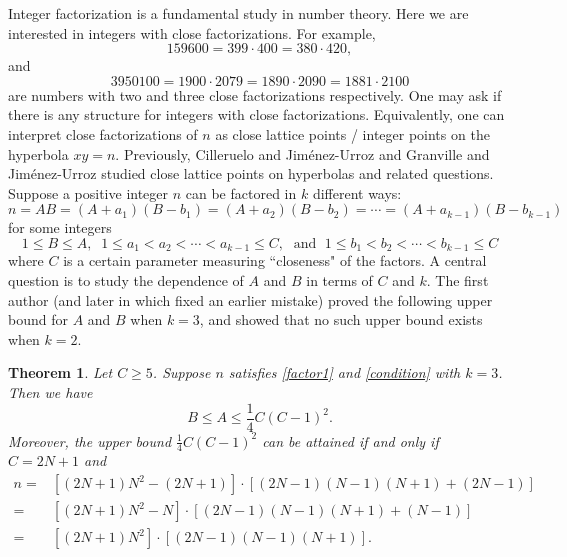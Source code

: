 \documentclass[12pt]{article}
\newtheorem{thm}{Theorem}
\begin{document}
Integer factorization is a fundamental study in number theory. Here we are interested in integers with close factorizations. For example,
\[
159600 = 399 \cdot 400 = 380 \cdot 420,
\]
and
\[
3950100 = 1900 \cdot 2079 = 1890 \cdot 2090 = 1881 \cdot 2100
\]
are numbers with two and three close factorizations respectively. One may ask if there is any structure for integers with close factorizations. Equivalently, one can interpret close factorizations of $n$ as close lattice points / integer points on the hyperbola $x y = n$. Previously, Cilleruelo and Jim\'{e}nez-Urroz \cite{CJ1, CJ2} and Granville and Jim\'{e}nez-Urroz \cite{GJ} studied close lattice points on hyperbolas and related questions. Suppose a positive integer $n$ can be factored in $k$ different ways:
\begin{equation} \label{factor1}
n = A B = (A + a_1) (B - b_1) = (A + a_2) (B - b_2) = \cdots = (A + a_{k-1}) (B - b_{k-1})
\end{equation}
for some integers
\begin{equation} \label{condition}
1 \le B \le A, \; \; 1 \le a_1 < a_2 < \cdots < a_{k-1} \le C, \; \text{ and } \; 1 \le b_1 < b_2 < \cdots < b_{k-1} \le C
\end{equation}
where $C$ is a certain parameter measuring ``closeness" of the factors.  A central question is to study the dependence of $A$ and $B$ in terms of $C$ and $k$. The first author \cite{C1} (and later in \cite{C2} which fixed an earlier mistake) proved the following upper bound for $A$ and $B$ when $k = 3$, and showed that no such upper bound exists when $k = 2$.
\begin{thm} \label{thm0}
Let $C \ge 5$. Suppose $n$ satisfies \eqref{factor1} and \eqref{condition} with $k = 3$. Then we have
\[
B \le A \le \frac{1}{4} C (C-1)^2.
\]
Moreover, the upper bound $\frac{1}{4} C (C-1)^2$ can be attained if and only if $C = 2N+1$ and
\begin{align*}
n =& [(2N+1) N^2 - (2N+1)] \cdot [(2N-1) (N-1)(N+1) + (2N-1)] \\
=& [(2N+1) N^2 - N] \cdot [(2N-1) (N-1)(N+1) + (N-1)] \\
=&  [(2N+1) N^2] \cdot [(2N-1)(N-1)(N+1)].
\end{align*}
\end{thm}
\end{document}
